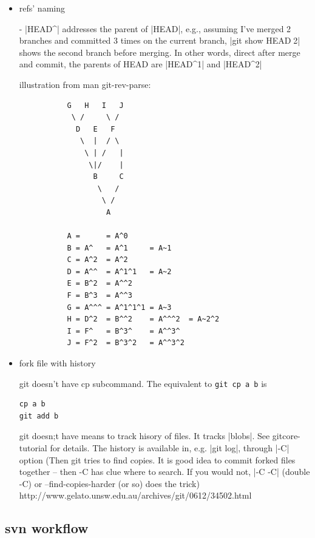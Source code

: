 \begin{itemize}
\item{refs' naming}

- |HEAD^| addresses the parent of |HEAD|, e.g., assuming I've
  merged 2 branches and committed 3 times on the current branch, 
  |git show HEAD^^^2| shows the second branch before merging. In
  other words, direct after merge and commit, the parents of HEAD are
  |HEAD^1|  and |HEAD^2|  
   
   illustration from man git-rev-parse:
   
   \begin{code} \begin{verbatim}
           G   H   I   J
            \ /     \ /
             D   E   F
              \  |  / \
               \ | /   |
                \|/    |
                 B     C
                  \   /
                   \ /
                    A

           A =      = A^0
           B = A^   = A^1     = A~1
           C = A^2  = A^2
           D = A^^  = A^1^1   = A~2
           E = B^2  = A^^2
           F = B^3  = A^^3
           G = A^^^ = A^1^1^1 = A~3
           H = D^2  = B^^2    = A^^^2  = A~2^2
           I = F^   = B^3^    = A^^3^
           J = F^2  = B^3^2   = A^^3^2

\end{verbatim} \end{code}

\item{fork file with history}

git doesn't have cp subcommand. The equivalent to \verb+git cp a b+ is 
\begin{code}\begin{verbatim}
cp a b
git add b
\end{verbatim} \end{code}

git doesn;t have means to track hisory of files. It tracks |blobs|.
See gitcore-tutorial for details. The history is available in, e.g.
%
|git log|, through |-C| option (Then git tries to find copies.
It is good idea to commit forked files together -- then -C has clue
where to search. If you would not, |-C -C| (double -C) or
--find-copies-harder (or so) does the trick)
http://www.gelato.unsw.edu.au/archives/git/0612/34502.html

\end{itemize}

\subsection{svn workflow}

